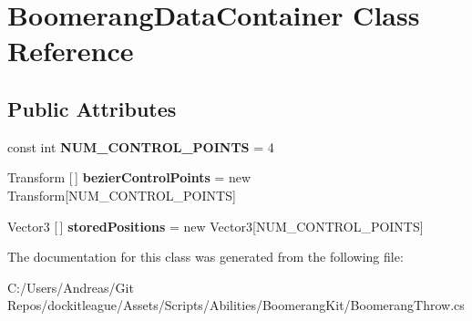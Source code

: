 \hypertarget{class_boomerang_data_container}{}\section{Boomerang\+Data\+Container Class Reference}
\label{class_boomerang_data_container}
\subsection*{Public Attributes}
\begin{DoxyCompactItemize}
\item 
\hypertarget{class_boomerang_data_container_ae39381e3abe25531ac3801267f058e12}{}\label{class_boomerang_data_container_ae39381e3abe25531ac3801267f058e12} 
const int {\bfseries N\+U\+M\+\_\+\+C\+O\+N\+T\+R\+O\+L\+\_\+\+P\+O\+I\+N\+TS} = 4
\item 
\hypertarget{class_boomerang_data_container_a27c9eff066cd2b09f1ac657c920fe63f}{}\label{class_boomerang_data_container_a27c9eff066cd2b09f1ac657c920fe63f} 
Transform \mbox{[}$\,$\mbox{]} {\bfseries bezier\+Control\+Points} = new Transform\mbox{[}N\+U\+M\+\_\+\+C\+O\+N\+T\+R\+O\+L\+\_\+\+P\+O\+I\+N\+TS\mbox{]}
\item 
\hypertarget{class_boomerang_data_container_a75b364be258a425be12dbb952e415d2a}{}\label{class_boomerang_data_container_a75b364be258a425be12dbb952e415d2a} 
Vector3 \mbox{[}$\,$\mbox{]} {\bfseries stored\+Positions} = new Vector3\mbox{[}N\+U\+M\+\_\+\+C\+O\+N\+T\+R\+O\+L\+\_\+\+P\+O\+I\+N\+TS\mbox{]}
\end{DoxyCompactItemize}


The documentation for this class was generated from the following file\+:\begin{DoxyCompactItemize}
\item 
C\+:/\+Users/\+Andreas/\+Git Repos/dockitleague/\+Assets/\+Scripts/\+Abilities/\+Boomerang\+Kit/Boomerang\+Throw.\+cs\end{DoxyCompactItemize}
